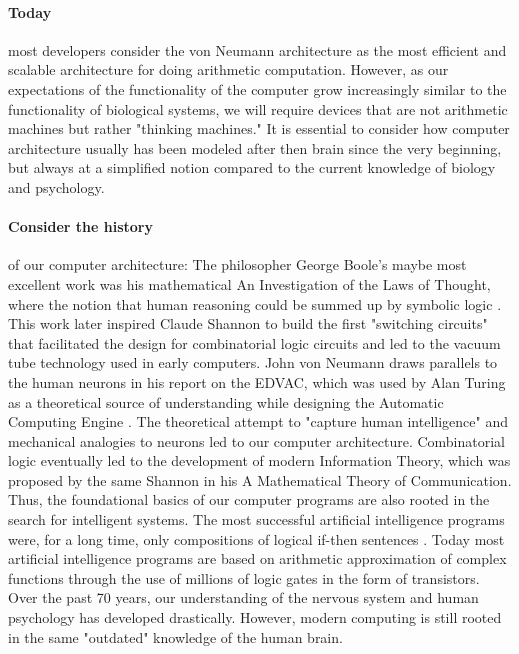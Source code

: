 \paragraph{Today} most developers consider the von Neumann architecture as the most efficient and scalable architecture for doing arithmetic computation.
However, as our expectations of the functionality of the computer grow increasingly similar to the functionality of biological systems, we will require devices that are not arithmetic machines but rather "thinking machines."
It is essential to consider how computer architecture usually has been modeled after then brain since the very beginning, but always at a simplified notion compared to the current knowledge of biology and psychology.

\paragraph{Consider the history} of our computer architecture:
The philosopher George Boole's maybe most excellent work was his mathematical An Investigation of the Laws of Thought, where the notion that human reasoning could be summed up by symbolic logic \cite{boole_investigation_1854}.
This work later inspired Claude Shannon to build the first "switching circuits" that facilitated the design for combinatorial logic circuits and led to the vacuum tube technology used in early computers.
John von Neumann draws parallels to the human neurons in his report on the EDVAC, which was used by Alan Turing as a theoretical source of understanding while designing the Automatic Computing Engine \cite{von_neumann_first_1993}.
The theoretical attempt to "capture human intelligence" and mechanical analogies to neurons led to our computer architecture.
Combinatorial logic eventually led to the development of modern Information Theory, which was proposed by the same Shannon in his A Mathematical Theory of Communication.
Thus, the foundational basics of our computer programs are also rooted in the search for intelligent systems.
The most successful artificial intelligence programs were, for a long time, only compositions of logical if-then sentences \cite{haenlein_brief_2019}.
Today most artificial intelligence programs are based on arithmetic approximation of complex functions through the use of millions of logic gates in the form of transistors.
Over the past 70 years, our understanding of the nervous system and human psychology has developed drastically. However, modern computing is still rooted in the same "outdated" knowledge of the human brain.

